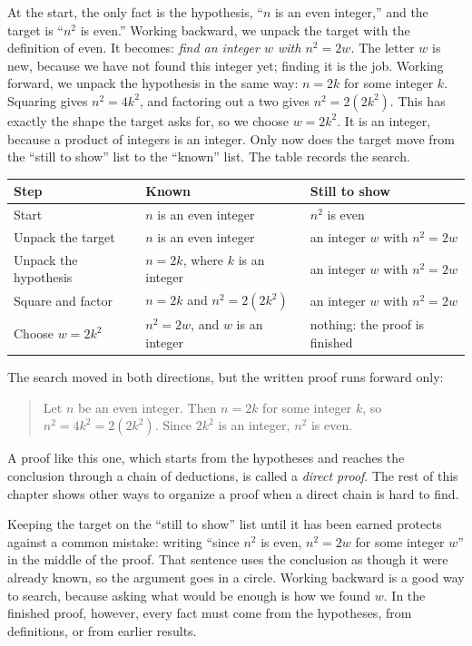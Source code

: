 At the start, the only fact is the hypothesis, ``$n$ is an even integer,'' and the target is ``$n^2$ is even.'' Working backward, we unpack the target with the definition of even. It becomes: \emph{find an integer $w$ with $n^2=2w$.} The letter $w$ is new, because we have not found this integer yet; finding it is the job. Working forward, we unpack the hypothesis in the same way: $n=2k$ for some integer $k$. Squaring gives $n^2=4k^2$, and factoring out a two gives $n^2=2(2k^2)$. This has exactly the shape the target asks for, so we choose $w=2k^2$. It is an integer, because a product of integers is an integer. Only now does the target move from the ``still to show'' list to the ``known'' list. The table records the search.
\begin{center}
\begin{tabularx}{\linewidth}{@{}l>{\raggedright\arraybackslash}X>{\raggedright\arraybackslash}X@{}}
\toprule
Step & Known & Still to show\\
\midrule
Start & $n$ is an even integer & $n^2$ is even\\
Unpack the target & $n$ is an even integer & an integer $w$ with $n^2=2w$\\
Unpack the hypothesis & $n=2k$, where $k$ is an integer & an integer $w$ with $n^2=2w$\\
Square and factor & $n=2k$ and $n^2=2(2k^2)$ & an integer $w$ with $n^2=2w$\\
Choose $w=2k^2$ & $n^2=2w$, and $w$ is an integer & nothing: the proof is finished\\
\bottomrule
\end{tabularx}
\end{center}
The search moved in both directions, but the written proof runs forward only:
\begin{quote}
Let $n$ be an even integer. Then $n=2k$ for some integer $k$, so $n^2=4k^2=2(2k^2)$. Since $2k^2$ is an integer, $n^2$ is even.
\end{quote}
A proof like this one, which starts from the hypotheses and reaches the conclusion through a chain of deductions, is called a \emph{direct proof}. The rest of this chapter shows other ways to organize a proof when a direct chain is hard to find.

Keeping the target on the ``still to show'' list until it has been earned protects against a common mistake: writing ``since $n^2$ is even, $n^2=2w$ for some integer $w$'' in the middle of the proof. That sentence uses the conclusion as though it were already known, so the argument goes in a circle. Working backward is a good way to search, because asking what would be enough is how we found $w$. In the finished proof, however, every fact must come from the hypotheses, from definitions, or from earlier results.

